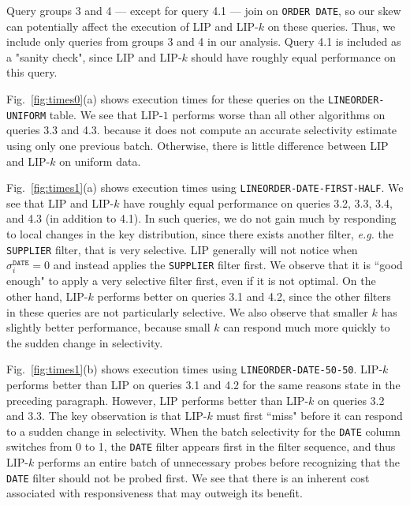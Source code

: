 Query groups 3 and 4 --- except for query 4.1 --- join on \texttt{ORDER DATE}, 
so our skew can potentially affect the execution of LIP and LIP-$k$ on these queries.
Thus, we include only queries from groups 3 and 4 in our analysis. 
Query 4.1 is included as a "sanity check", since LIP and LIP-$k$ should have roughly equal performance on this query.

Fig.~\ref{fig:times0}(a) shows execution times for these queries on the \texttt{LINEORDER-UNIFORM} table.
We see that LIP-$1$ performs worse than all other algorithms on queries 3.3 and 4.3.
because it does not compute an accurate selectivity estimate using only one previous batch.
Otherwise, there is little difference between LIP and LIP-$k$ on uniform data.

Fig.~\ref{fig:times1}(a) shows execution times using \texttt{LINEORDER-DATE-FIRST-HALF}. 
We see that LIP and LIP-$k$ have roughly equal performance on queries 3.2, 3.3, 3.4, and 4.3 (in addition to 4.1).
In such queries, we do not gain much by responding to local changes in the key distribution,
since there exists another filter, {\it e.g.} the \texttt{SUPPLIER} filter, that is very selective. 
LIP generally will not notice when $\sigma_i^{\texttt{DATE}} = 0$ 
and instead applies the \texttt{SUPPLIER} filter first.
We observe that it is ``good enough" to apply a very selective filter first, even if it is not optimal.
On the other hand, LIP-$k$ performs better on queries 3.1 and 4.2, 
since the other filters in these queries are not particularly selective. 
We also observe that smaller $k$ has slightly better performance, 
because small $k$ can respond much more quickly to the sudden change in selectivity.

Fig.~\ref{fig:times1}(b) shows execution times using \texttt{LINEORDER-DATE-50-50}. 
LIP-$k$ performs better than LIP on queries 3.1 and 4.2 for the same reasons state in the preceding paragraph.
However, LIP performs better than LIP-$k$ on queries 3.2 and 3.3.
The key observation is that LIP-$k$ must first ``miss" before it can respond to a sudden change in selectivity.
When the batch selectivity for the \texttt{DATE} column switches from 0 to 1, 
the \texttt{DATE} filter appears first in the filter sequence, 
and thus LIP-$k$ performs an entire batch of unnecessary probes
before recognizing that the \texttt{DATE} filter should not be probed first.
We see that there is an inherent cost associated with responsiveness that may outweigh its benefit. 

